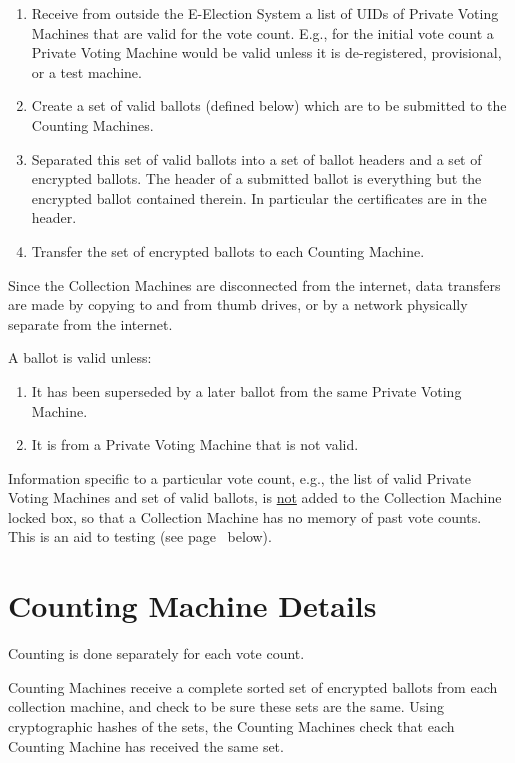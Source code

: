 \documentclass[12pt]{article}
\newcommand{\pagref}[1]{(see page~\pageref{#1} below)}
\begin{document}
\begin{enumerate}
\setcounter{enumi}{\value{CMC-COUNTER}}
\item Receive from outside the E-Election System a list of UIDs of
Private Voting Machines that are valid for the vote count.
E.g., for the initial vote count a Private Voting Machine would
be valid unless it is de-registered, provisional, or a test machine.
\item Create a set of valid ballots (defined below)
which are to be submitted to the Counting Machines.
\item Separated this set of valid ballots into a set of ballot headers
and a set of encrypted ballots.  The header of a submitted ballot is
everything but the encrypted ballot contained therein.  In particular
the certificates are in the header.
\item Transfer the set of encrypted ballots to each Counting Machine.
\end{enumerate}

Since the Collection Machines are disconnected from the internet,
data transfers are made by copying to and from thumb drives, or by
a network physically separate from the internet.

A ballot is valid unless:

\begin{enumerate}
\item It has been superseded by a later ballot from the same
Private Voting Machine.
\item It is from a Private Voting Machine that is not valid.
\end{enumerate}

Information specific to a particular vote count, e.g., the
list of valid Private Voting Machines and set of valid ballots,
is \underline{not} added to the Collection Machine locked box,
so that a Collection Machine has no memory of past vote counts.
This is an aid to testing \pagref{TESTING}.

\section{Counting Machine Details}

Counting is done separately for each vote count.

Counting Machines receive a complete sorted set of encrypted ballots
from each collection machine, and check to be sure these sets
are the same.  Using cryptographic hashes of the sets, the Counting
Machines check that each Counting Machine has received the same set.
\end{document}
